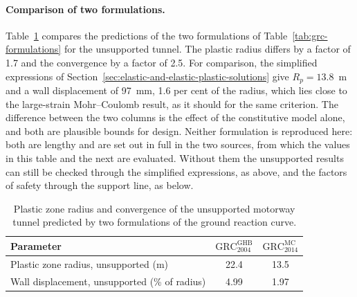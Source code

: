\paragraph{Comparison of two formulations.}
Table~\ref{tab:grc-comparison} compares the predictions of the two
formulations of Table~\ref{tab:grc-formulations} for the unsupported tunnel.
The plastic radius differs by a factor of 1.7 and the convergence by a factor
of 2.5. For comparison, the simplified expressions of
Section~\ref{sec:elastic-and-elastic-plastic-solutions} give
$R_p = 13.8$~m and a wall displacement of 97~mm, 1.6 per cent of the radius,
which lies close to the large-strain Mohr--Coulomb result, as it should for
the same criterion. The difference between the two columns is the effect of
the constitutive model alone, and both are plausible bounds for design.
Neither formulation is reproduced here: both are lengthy and are set out in
full in the two sources, from which the values in this table and the next are
evaluated. Without them the unsupported results can still be checked through
the simplified expressions, as above, and the factors of safety through the
support line, as below.

\begin{table}[htbp]
\caption{Plastic zone radius and convergence of the unsupported motorway tunnel predicted by two formulations of the ground reaction curve.}
\label{tab:grc-comparison}
\centering
\small
\begin{tabular}{lcc}
\toprule
\textbf{Parameter} & $\mathrm{GRC}^{\mathrm{GHB}}_{2004}$ & $\mathrm{GRC}^{\mathrm{MC}}_{2014}$ \\
\midrule
Plastic zone radius, unsupported (m) & 22.4 & 13.5 \\
Wall displacement, unsupported (\% of radius) & 4.99 & 1.97 \\
\bottomrule
\end{tabular}
\end{table}

